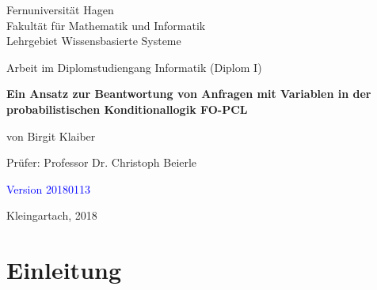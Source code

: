 \documentclass[a4paper, 11pt]{book}
\begin{document}
\begin{titlepage}
\thispagestyle{empty}
\begin{center}
\Large{Fernuniversität Hagen}\\
\Large{Fakultät für Mathematik und Informatik}\\
\Large{Lehrgebiet Wissensbasierte Systeme}\\[1.5cm]
\end{center}


\begin{center}
{Arbeit im Diplomstudiengang Informatik (Diplom I)}\\[2.0cm]
\end{center}

\begin{center}


\LARGE \textbf{Ein Ansatz zur Beantwortung von Anfragen mit Variablen in der probabilistischen Konditionallogik FO-PCL}\\[3.5cm]
\end{center}


\begin{center}
\large{von Birgit Klaiber}\\[3.5cm]
\end{center}

\begin{center}
\large{Prüfer: Professor Dr. Christoph Beierle }\\[1.0cm]
\end{center}

\begin{center}
\textcolor{blue}{Version 20180113}
	
\large{Kleingartach, 2018}
\end{center}

\end{titlepage}






\begingroup



\setcounter{tocdepth}{1}

\tableofcontents
\clearpage
\endgroup
{}
\pagestyle{plain}
\setcounter{page}{1}
\pagestyle{headings}


\setlength{\parskip}{5pt}




\chapter{Einleitung}
\end{document}
